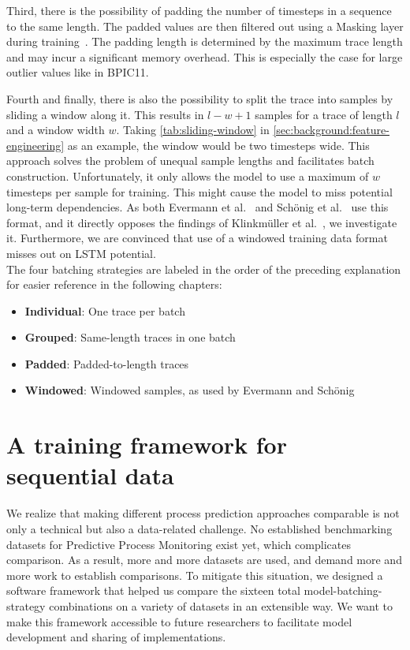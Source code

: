 Third, there is the possibility of padding the number of timesteps in a sequence to the same length.
The padded values are then filtered out using a Masking layer during training~\cite{web:keras}.
The padding length is determined by the maximum trace length and may incur a significant memory overhead.
This is especially the case for large outlier values like in BPIC11.

Fourth and finally, there is also the possibility to split the trace into samples by sliding a window along it.
This results in $l-w+1$ samples for a trace of length $l$ and a window width $w$.
Taking \autoref{tab:sliding-window} in \autoref{sec:background:feature-engineering} as an example, the window would be two timesteps wide.
This approach solves the problem of unequal sample lengths and facilitates batch construction.
Unfortunately, it only allows the model to use a maximum of $w$ timesteps per sample for training.
This might cause the model to miss potential long-term dependencies.
As both Evermann et al.~\cite{evermann2016} and Schönig et al.~\cite{schoenig2018} use this format, and it directly opposes the findings of Klinkmüller et al.~\cite{klinkmuller2018reliablemonitoring}, we investigate it.
Furthermore, we are convinced that use of a windowed training data format misses out on LSTM potential.\\

The four batching strategies are labeled in the order of the preceding explanation for easier reference in the following chapters:
\begin{itemize}
\item\textbf{Individual}: One trace per batch
\item\textbf{Grouped}: Same-length traces in one batch
\item\textbf{Padded}: Padded-to-length traces
\item\textbf{Windowed}: Windowed samples, as used by Evermann and Schönig
\end{itemize}

\section{A training framework for sequential data}
\label{sec:contrib:training-framework}
We realize that making different process prediction approaches comparable is not only a technical but also a data-related challenge.
No established benchmarking datasets for Predictive Process Monitoring exist yet, which complicates comparison.
As a result, more and more datasets are used, and demand more and more work to establish comparisons.
To mitigate this situation, we designed a software framework that helped us compare the sixteen total model-batching-strategy combinations on a variety of datasets in an extensible way.
We want to make this framework accessible to future researchers to facilitate model development and sharing of implementations.\\

